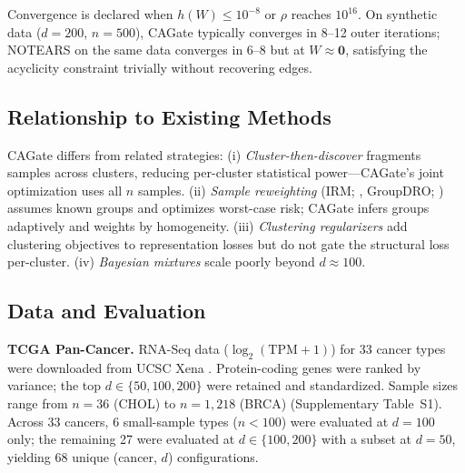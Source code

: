 \documentclass[12pt,a4paper]{article}
\begin{document}
Convergence is declared when $h(W) \leq 10^{-8}$ or $\rho$ reaches $10^{16}$. On synthetic data ($d=200$, $n=500$), CAGate typically converges in 8--12 outer iterations; NOTEARS on the same data converges in 6--8 but at $W \approx \mathbf{0}$, satisfying the acyclicity constraint trivially without recovering edges.









\subsection{Relationship to Existing Methods}









CAGate differs from related strategies: (i) \textit{Cluster-then-discover} fragments samples across clusters, reducing per-cluster statistical power---CAGate's joint optimization uses all $n$ samples. (ii) \textit{Sample reweighting} (IRM; \cite{Arjovsky2019}, GroupDRO; \cite{Sagawa2020}) assumes known groups and optimizes worst-case risk; CAGate infers groups adaptively and weights by homogeneity. (iii) \textit{Clustering regularizers} \cite{Xie2016} add clustering objectives to representation losses but do not gate the structural loss per-cluster. (iv) \textit{Bayesian mixtures} \cite{Wood2006} scale poorly beyond $d \approx 100$.









\subsection{Data and Evaluation}









\noindent\textbf{TCGA Pan-Cancer.} RNA-Seq data ($\log_2(\text{TPM}+1)$) for 33 cancer types were downloaded from UCSC Xena \cite{Goldman2020}. Protein-coding genes were ranked by variance; the top $d \in \{50, 100, 200\}$ were retained and standardized. Sample sizes range from $n=36$ (CHOL) to $n=1,218$ (BRCA) (Supplementary Table~S1). Across 33 cancers, 6 small-sample types ($n < 100$) were evaluated at $d=100$ only; the remaining 27 were evaluated at $d \in \{100, 200\}$ with a subset at $d=50$, yielding 68 unique (cancer, $d$) configurations.
\end{document}
